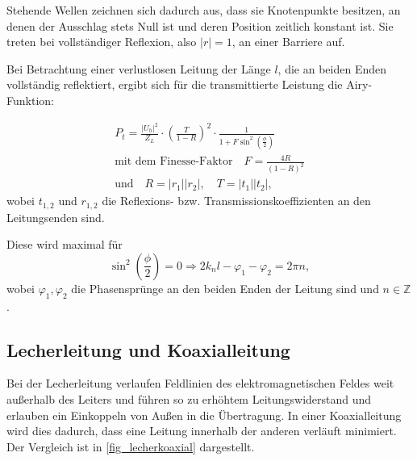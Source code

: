 \documentclass[
	a4paper,
	12pt,
	pagesize,
	ngerman
]{scrartcl}
\begin{document}
	Stehende Wellen zeichnen sich dadurch aus, dass sie Knotenpunkte besitzen, an denen der Ausschlag stets Null ist und deren Position zeitlich konstant ist.
	Sie treten bei vollständiger Reflexion, also $| r | = 1	$, an einer Barriere auf.

	Bei Betrachtung einer verlustlosen Leitung der Länge $l$, die an beiden Enden vollständig reflektiert, ergibt sich für die transmittierte Leistung die Airy-Funktion:

	\begin{align}
		P_t = \frac{|U_h|^2}{Z_L} \cdot \left( \frac{T}{1-R} \right) ^2 \cdot \frac{1}{1+F \sin^2 \left( \frac{\phi}{2} \right) } \\
		\text{mit dem Finesse-Faktor} \quad F= \frac{4R}{(1-R)^2} \\
		\text{und} \quad R = |r_1 ||r_2 |, \quad T= |t_1||t_2|,
	\end{align}
	wobei $t_{1,2}$ und $r_{1,2}$ die Reflexions- bzw. Transmissionskoeffizienten an den Leitungsenden sind.

	Diese wird maximal für
	\begin{equation}
		\label{eq_inter}
	\sin ^2 \left( \frac{\phi}{2} \right) = 0 \Rightarrow 2k_nl -\varphi_1 - \varphi_2 = 2\pi n,
	\end{equation}
	wobei $\varphi_1, \varphi_2 $ die Phasensprünge an den beiden Enden der Leitung sind und $n \in \mathbb{Z}$.

	\subsection{Lecherleitung und Koaxialleitung}
	Bei der Lecherleitung verlaufen Feldlinien des elektromagnetischen Feldes weit außerhalb des Leiters und führen so zu erhöhtem Leitungswiderstand und erlauben ein Einkoppeln von Außen in die Übertragung.
	In einer Koaxialleitung wird dies dadurch, dass eine Leitung innerhalb der anderen verläuft minimiert.
	Der Vergleich ist in \cref{fig_lecherkoaxial} dargestellt.
\end{document}
